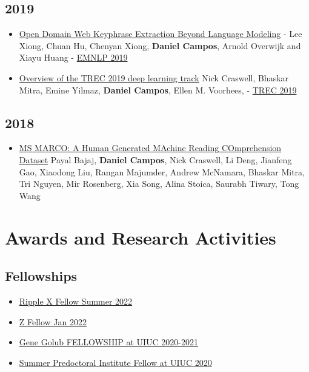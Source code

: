 \documentclass[line,margin]{res}
\begin{document}
\begin{resume}
\subsection{2019}
    \begin{itemize}
    \item \href{https://arxiv.org/abs/1911.02671}{Open Domain Web Keyphrase Extraction Beyond Language Modeling} - Lee Xiong, Chuan Hu, Chenyan Xiong, \textbf{Daniel Campos}, Arnold Overwijk and Xiayu Huang - \href{https://www.emnlp-ijcnlp2019.org/}{EMNLP 2019}
    \item \href{https://arxiv.org/abs/2003.07820}{Overview of the TREC 2019 deep learning track} Nick Craswell, Bhaskar Mitra, Emine Yilmaz, \textbf{Daniel Campos}, Ellen M. Voorhees, - \href{https://trec.nist.gov/tracks.html}{TREC 2019}
    \end{itemize}
\subsection{2018}
    \begin{itemize}
    \item \href{https://arxiv.org/abs/1611.09268}{MS MARCO: A Human Generated MAchine Reading COmprehension Dataset} Payal Bajaj, \textbf{Daniel Campos}, Nick Craswell, Li Deng, Jianfeng Gao, Xiaodong Liu, Rangan Majumder, Andrew McNamara, Bhaskar Mitra, Tri Nguyen, Mir Rosenberg, Xia Song, Alina Stoica, Saurabh Tiwary, Tong Wang 
    \end{itemize}
\section{Awards and Research Activities}
\subsection{Fellowships}
\begin{itemize}
    \item \href{https://www.fellowship.rippleventures.com/fellowship-program}{Ripple X Fellow Summer 2022}
    \item \href{https://www.zfellows.com/}{Z Fellow Jan 2022}
    \item \href{https://cs.illinois.edu/about/awards/graduate-fellowships-awards/computer-science-gene-golub-fellowship}{Gene Golub FELLOWSHIP at UIUC 2020-2021}
    \item \href{https://grad.illinois.edu/diversity/spi}{Summer Predoctoral Institute Fellow at UIUC 2020}
\end{itemize}

\end{resume}
\end{document}
